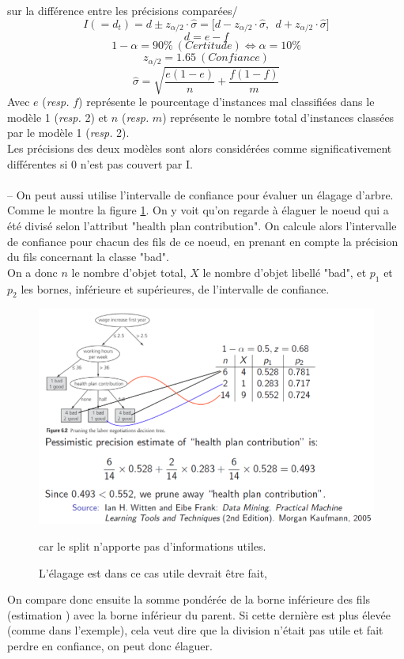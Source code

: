 \documentclass[letterpaper, 12pt]{article}
\newcommand{\alinea}{
\hspace*{0.5cm}}
\newcommand{\myul}[1]{
		\underline{\smash{#1}}
	}
\begin{document}
			sur la différence entre les précisions comparées/
			$$ I (= d_t) = d \pm z_{\alpha/2} \cdot 
				\hat{\sigma} = \mathbf{[} d - z_{\alpha/2} \cdot 
				\hat{\sigma}\mathbf{,}\ \ d + z_{\alpha/2} \cdot 
				\hat{\sigma}\mathbf{]} $$
			$$ d = e - f $$
			$$ 1-\alpha = 90\%\ (Certitude) \Leftrightarrow 
				\alpha = 10\% $$
			$$ z_{\alpha/2} = 1.65\ (Confiance) $$
			$$ \hat{\sigma} = \sqrt{\dfrac{e(1 - e)}{n} + 
				\dfrac{f(1 - f)}{m}} $$
			Avec $e$ (\textit{resp.} $f$) représente le 
			pourcentage d'instances mal classifiées
			dans le modèle 1 (\textit{resp.} 2) et $n$ 
			(\textit{resp.} $m$) représente le nombre total
			d'instances classées par le modèle 1 (\textit{resp.} 2).\\
		\alinea Les précisions des deux modèles sont alors 
			considérées comme significativement différentes si
			0 n'est pas couvert par I. \\
		~\\
		\myul{\textbf{\hl{Remarque}}} -- On peut aussi utilise l'intervalle
			de confiance pour évaluer un élagage d'arbre. Comme le montre
			la figure \ref{fig:pruning}. On y voit qu'on regarde à élaguer
			le noeud qui a été divisé selon l'attribut "health plan
			contribution". On calcule alors l'intervalle de confiance 
			pour chacun des fils de ce noeud, en prenant en compte la 
			précision du fils concernant la classe "bad".\\
			On a donc $n$ le nombre d'objet total, $X$ le nombre d'objet
			libellé "bad", et $p_1$ et $p_2$ les bornes, inférieure et 
			supérieures, de l'intervalle de confiance.
		\begin{figure}[H]
			\centering
			\includegraphics[scale=0.45]{Images/pruning.png}
			\caption{L'élagage est dans ce cas utile devrait être fait,}
					 car le split n'apporte pas d'informations utiles.
			\label{fig:pruning}
		\end{figure}\noindent
		\alinea On compare donc ensuite la somme pondérée de la borne 
			inférieure des fils (estimation \myul{pessimiste}) avec
			la borne inférieur du parent. Si cette dernière est 
			plus élevée (comme dans l'exemple), cela veut dire que
			la division n'était pas utile et fait perdre en confiance, 
			on peut donc élaguer.
	\newpage
\end{document}
